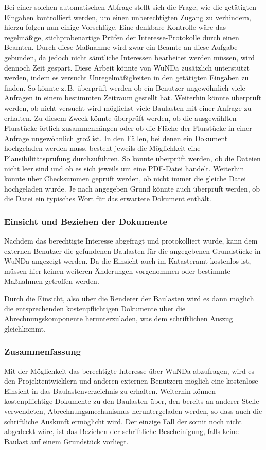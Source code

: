 Bei einer solchen automatischen Abfrage stellt sich die Frage, wie die getätigten Eingaben kontrolliert werden, um einen unberechtigten Zugang zu verhindern, hierzu folgen nun einige Vorschläge.
Eine denkbare Kontrolle wäre das regelmäßige, stichprobenartige Prüfen der Interesse-Protokolle durch einen Beamten.
Durch diese Maßnahme wird zwar ein Beamte an diese Aufgabe gebunden, da jedoch nicht sämtliche Interessen bearbeitet werden müssen, wird dennoch Zeit gespart.
Diese Arbeit könnte von \ac{WuNDa} zusätzlich unterstützt werden, indem es versucht Unregelmäßigkeiten in den getätigten Eingaben zu finden.
So könnte z.\,B. überprüft werden ob ein Benutzer ungewöhnlich viele Anfragen in einem bestimmten Zeitraum gestellt hat.
Weiterhin könnte überprüft werden, ob nicht versucht wird möglichst viele Baulasten mit einer Anfrage zu erhalten.
Zu diesem Zweck könnte überprüft werden, ob die ausgewählten Flurstücke örtlich zusammenhängen oder ob die Fläche der Flurstücke in einer Anfrage ungewöhnlich groß ist.
In den Fällen, bei denen ein Dokument hochgeladen werden muss, besteht jeweils die Möglichkeit eine Plausibilitätsprüfung durchzuführen.
So könnte überprüft werden, ob die Dateien nicht leer sind und ob es sich jeweils um eine PDF-Datei handelt.
Weiterhin könnte über Checksummen geprüft werden, ob nicht immer die gleiche Datei hochgeladen wurde.
Je nach angegeben Grund könnte auch überprüft werden, ob die Datei ein typisches Wort für das erwartete Dokument enthält.

\subsubsection{Einsicht und Beziehen der Dokumente}
Nachdem das berechtigte Interesse abgefragt und protokolliert wurde, kann dem externen Benutzer die gefundenen Baulasten für die angegebenen Grundstücke in \ac{WuNDa} angezeigt werden.
Da die Einsicht auch im Katasteramt kostenlos ist, müssen hier keinen weiteren Änderungen vorgenommen oder bestimmte Maßnahmen getroffen werden.

Durch die Einsicht, also über die Renderer der Baulasten wird es dann möglich die entsprechenden kostenpflichtigen Dokumente über die Abrechnungskomponente herunterzuladen, was dem schriftlichen Auszug gleichkommt.

\subsubsection{Zusammenfassung}
Mit der Möglichkeit das berechtigte Interesse über \ac{WuNDa} abzufragen, wird es den Projektentwicklern und anderen externen Benutzern möglich eine kostenlose Einsicht in das Baulastenverzeichnis zu erhalten.
Weiterhin können kostenpflichtige Dokumente zu den Baulasten über, den bereits an anderer Stelle verwendeten, Abrechnungsmechanismus heruntergeladen werden, so dass auch die schriftliche Auskunft ermöglicht wird.
Der einzige Fall der somit noch nicht abgedeckt wäre, ist das Beziehen der schriftliche Bescheinigung, falls keine Baulast auf einem Grundstück vorliegt.

